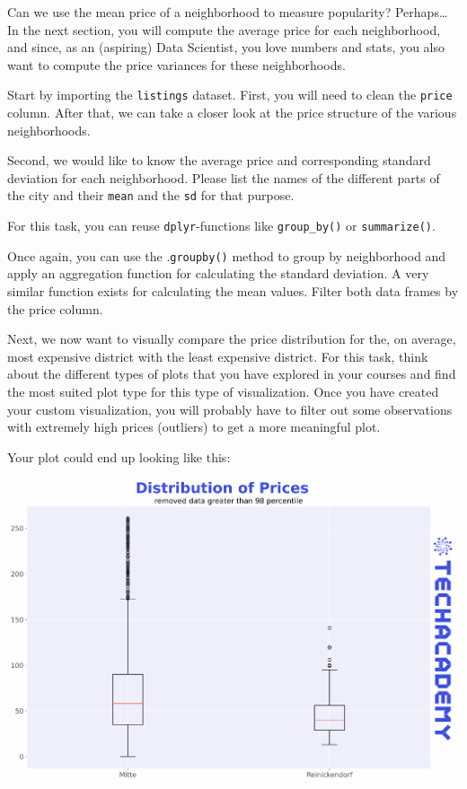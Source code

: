 \documentclass[
  11pt,
]{article}
\newenvironment{tips}[1]
  {
  \begin{itemize}
  \footnotesize
  \renewcommand{\labelitemi}{
    \raisebox{-.7\height}[0pt][0pt]{
      {\setkeys{Gin}{width=3em,keepaspectratio}
        \texttt{[image: images/\#1.png]}}
    }
  }
  \setlength{\fboxsep}{1em}
  \begin{rbox}
  \item
  }
  {
  \end{rbox}
  \end{itemize}
  }
\newenvironment{tipsp}[1]
  {
  \begin{itemize}
  \footnotesize
  \renewcommand{\labelitemi}{
    \raisebox{-.7\height}[0pt][0pt]{
      {\setkeys{Gin}{width=3em,keepaspectratio}
        \texttt{[image: images/\#1.png]}}
    }
  }
  \setlength{\fboxsep}{1em}
  \begin{pbox}
  \item
  }
  {
  \end{pbox}
  \end{itemize}
  }
\begin{document}
Can we use the mean price of a neighborhood to measure popularity?
Perhaps\ldots{} In the next section, you will compute the average price for each neighborhood, and since, as an (aspiring) Data Scientist, you love numbers and stats, you also want to compute the price variances for these neighborhoods.

Start by importing the \texttt{listings} dataset.
First, you will need to clean the \texttt{price} column.
After that, we can take a closer look at the price structure of the various neighborhoods.

Second, we would like to know the average price and corresponding standard deviation for each neighborhood.
Please list the names of the different parts of the city and their \texttt{mean} and the \texttt{sd} for that purpose.

\begin{tips}r
For this task, you can reuse \texttt{dplyr}-functions like \texttt{group\_by()} or \texttt{summarize()}.

\end{tips}

\begin{tipsp}p
Once again, you can use the .\texttt{groupby()} method to group by neighborhood and apply an aggregation function for calculating the standard deviation.
A very similar function exists for calculating the mean values.
Filter both data frames by the price column.

\end{tipsp}

Next, we now want to visually compare the price distribution for the, on average, most expensive district with the least expensive district.
For this task, think about the different types of plots that you have explored in your courses and find the most suited plot type for this type of visualization.
Once you have created your custom visualization, you will probably have to filter out some observations with extremely high prices (outliers) to get a more meaningful plot.

Your plot could end up looking like this:

\begin{center}\includegraphics[width=1\linewidth]{plot/01_python/box_plots} \end{center}
\end{document}
